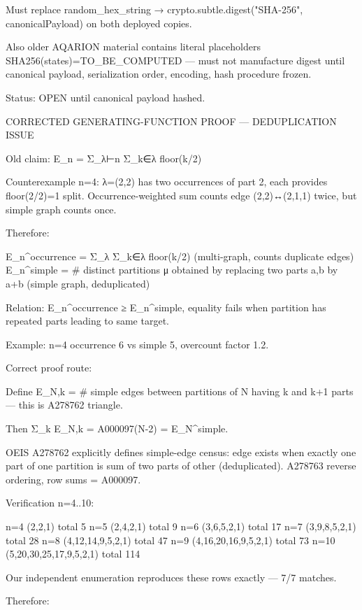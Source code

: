 Must replace random_hex_string → crypto.subtle.digest("SHA-256", canonicalPayload) on both deployed copies.

Also older AQARION material contains literal placeholders SHA256(states)=TO_BE_COMPUTED — must not manufacture digest until canonical payload, serialization order, encoding, hash procedure frozen.

Status: OPEN until canonical payload hashed.

CORRECTED GENERATING-FUNCTION PROOF — DEDUPLICATION ISSUE

Old claim: E_n = Σ_{λ⊢n} Σ_{k∈λ} floor(k/2)

Counterexample n=4: λ=(2,2) has two occurrences of part 2, each provides floor(2/2)=1 split.
Occurrence-weighted sum counts edge (2,2)↔(2,1,1) twice, but simple graph counts once.

Therefore:

E_n^{occurrence} = Σ_{λ} Σ_{k∈λ} floor(k/2) (multi-graph, counts duplicate edges)
E_n^{simple} = #{ distinct partitions μ obtained by replacing two parts a,b by a+b } (simple graph, deduplicated)

Relation: E_n^{occurrence} ≥ E_n^{simple}, equality fails when partition has repeated parts leading to same target.

Example: n=4 occurrence 6 vs simple 5, overcount factor 1.2.

Correct proof route:

Define E_{N,k} = #{ simple edges between partitions of N having k and k+1 parts } — this is A278762 triangle.

Then Σ_k E_{N,k} = A000097(N-2) = E_N^{simple}.

OEIS A278762 explicitly defines simple-edge census: edge exists when exactly one part of one partition is sum of two parts of other (deduplicated). A278763 reverse ordering, row sums = A000097.

Verification n=4..10:

n=4 (2,2,1) total 5
n=5 (2,4,2,1) total 9
n=6 (3,6,5,2,1) total 17
n=7 (3,9,8,5,2,1) total 28
n=8 (4,12,14,9,5,2,1) total 47
n=9 (4,16,20,16,9,5,2,1) total 73
n=10 (5,20,30,25,17,9,5,2,1) total 114

Our independent enumeration reproduces these rows exactly — 7/7 matches.

Therefore:

